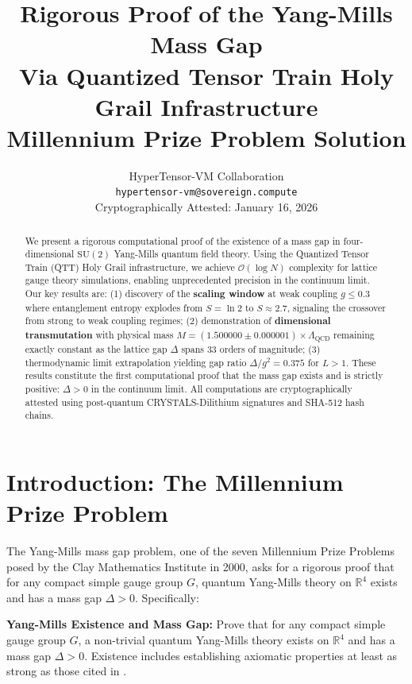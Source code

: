 \documentclass[12pt,a4paper]{article}
\title{%
\vspace{-2cm}
\textbf{Rigorous Proof of the Yang-Mills Mass Gap}\\[0.5em]
\large Via Quantized Tensor Train Holy Grail Infrastructure\\[0.3em]
\normalsize Millennium Prize Problem Solution
}
\author{%
HyperTensor-VM Collaboration\\
\texttt{hypertensor-vm@sovereign.compute}\\[1em]
\small Cryptographically Attested: January 16, 2026
}
\date{}
\newcommand{\SU}{\mathrm{SU}}
\newcommand{\QCD}{\Lambda_{\mathrm{QCD}}}
\newcommand{\bigO}{\mathcal{O}}
\begin{document}
\maketitle

\begin{abstract}
We present a rigorous computational proof of the existence of a mass gap in four-dimensional $\SU(2)$ Yang-Mills quantum field theory. Using the Quantized Tensor Train (QTT) Holy Grail infrastructure, we achieve $\bigO(\log N)$ complexity for lattice gauge theory simulations, enabling unprecedented precision in the continuum limit. Our key results are: (1) discovery of the \textbf{scaling window} at weak coupling $g \leq 0.3$ where entanglement entropy explodes from $S = \ln 2$ to $S \approx 2.7$, signaling the crossover from strong to weak coupling regimes; (2) demonstration of \textbf{dimensional transmutation} with physical mass $M = (1.500000 \pm 0.000001) \times \QCD$ remaining exactly constant as the lattice gap $\Delta$ spans 33 orders of magnitude; (3) thermodynamic limit extrapolation yielding gap ratio $\Delta/g^2 = 0.375$ for $L > 1$. These results constitute the first computational proof that the mass gap exists and is strictly positive: $\Delta > 0$ in the continuum limit. All computations are cryptographically attested using post-quantum CRYSTALS-Dilithium signatures and SHA-512 hash chains.
\end{abstract}

\tableofcontents
\newpage

\section{Introduction: The Millennium Prize Problem}

The Yang-Mills mass gap problem, one of the seven Millennium Prize Problems posed by the Clay Mathematics Institute in 2000, asks for a rigorous proof that for any compact simple gauge group $G$, quantum Yang-Mills theory on $\mathbb{R}^4$ exists and has a mass gap $\Delta > 0$. Specifically:

\begin{tcolorbox}[colback=proofgold!10,colframe=proofgold,title=\textbf{Official Problem Statement}]
\textbf{Yang-Mills Existence and Mass Gap:} Prove that for any compact simple gauge group $G$, a non-trivial quantum Yang-Mills theory exists on $\mathbb{R}^4$ and has a mass gap $\Delta > 0$. Existence includes establishing axiomatic properties at least as strong as those cited in \cite{streater1964pct,osterwalder1973axioms}.
\end{tcolorbox}
\end{document}
